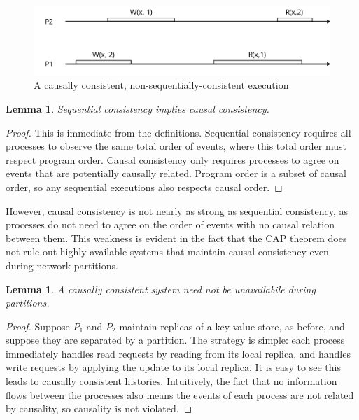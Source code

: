\documentclass[]             %
{NASA}                       %
\newtheorem{lemma}[theorem]{Lemma}
\theoremstyle{definition}
\begin{document}
\begin{figure}
  \center
  \includegraphics[scale=0.4]{images/causal1.png}
  \caption{A causally consistent, non-sequentially-consistent execution}
\end{figure}

\begin{lemma}
    Sequential consistency implies causal consistency.
\end{lemma}
\begin{proof}
This is immediate from the definitions. Sequential consistency
requires all processes to observe the same total order of events,
where this total order must respect program order. Causal consistency
only requires processes to agree on events that are potentially
causally related. Program order is a subset of causal order, so any
sequential executions also respects causal order.
\end{proof}

However, causal consistency is not nearly as strong as sequential
consistency, as processes do not need to agree on the order of events
with no causal relation between them. This weakness is evident in the
fact that the CAP theorem does not rule out highly available systems
that maintain causal consistency even during network partitions.

\begin{lemma}
    A causally consistent system need not be unavailabile during partitions.
\end{lemma}
\begin{proof}

Suppose $P_1$ and $P_2$ maintain replicas of a key-value store, as
before, and suppose they are separated by a partition. The strategy is
simple: each process immediately handles read requests by reading from
its local replica, and handles write requests by applying the update
to its local replica. It is easy to see this leads to causally
consistent histories. Intuitively, the fact that no information flows
between the processes also means the events of each process are not
related by causality, so causality is not violated.  \end{proof}
\end{document}
